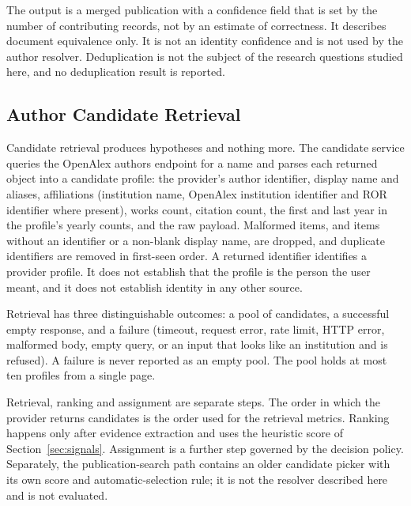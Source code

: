 The output is a merged publication with a confidence field that is set by the number of contributing records, not by an estimate of correctness. It describes document equivalence only. It is not an identity confidence and is not used by the author resolver. Deduplication is not the subject of the research questions studied here, and no deduplication result is reported.

\subsection{Author Candidate Retrieval}
\label{sec:candidates}
Candidate retrieval produces hypotheses and nothing more. The candidate service queries the OpenAlex authors endpoint for a name and parses each returned object into a candidate profile: the provider's author identifier, display name and aliases, affiliations (institution name, OpenAlex institution identifier and ROR identifier where present), works count, citation count, the first and last year in the profile's yearly counts, and the raw payload. Malformed items, and items without an identifier or a non-blank display name, are dropped, and duplicate identifiers are removed in first-seen order. A returned identifier identifies a provider profile. It does not establish that the profile is the person the user meant, and it does not establish identity in any other source.

Retrieval has three distinguishable outcomes: a pool of candidates, a successful empty response, and a failure (timeout, request error, rate limit, HTTP error, malformed body, empty query, or an input that looks like an institution and is refused). A failure is never reported as an empty pool. The pool holds at most ten profiles from a single page.

Retrieval, ranking and assignment are separate steps. The order in which the provider returns candidates is the order used for the retrieval metrics. Ranking happens only after evidence extraction and uses the heuristic score of Section~\ref{sec:signals}. Assignment is a further step governed by the decision policy. Separately, the publication-search path contains an older candidate picker with its own score and automatic-selection rule; it is not the resolver described here and is not evaluated.

